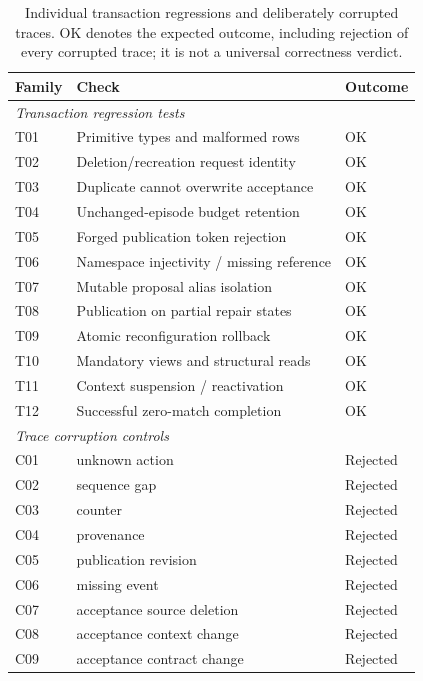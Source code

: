 \documentclass[pdflatex,sn-mathphys-num]{sn-jnl}
\theoremstyle{thmstyleone}
\theoremstyle{thmstylethree}
\theoremstyle{thmstyletwo}
\begin{document}
\begin{table}[tbp]
\centering
\caption{Individual transaction regressions and deliberately corrupted traces. OK denotes the expected outcome, including rejection of every corrupted trace; it is not a universal correctness verdict.}\label{tab:negative-controls}
\footnotesize
\setlength{\tabcolsep}{3pt}
\renewcommand{\arraystretch}{1.13}
\begin{tabularx}{\linewidth}{@{}lXl@{}}\toprule
Family & Check & Outcome\\\midrule
\multicolumn{3}{l}{\textit{Transaction regression tests}}\\
T01 & Primitive types and malformed rows & OK\\
T02 & Deletion/recreation request identity & OK\\
T03 & Duplicate cannot overwrite acceptance & OK\\
T04 & Unchanged-episode budget retention & OK\\
T05 & Forged publication token rejection & OK\\
T06 & Namespace injectivity / missing reference & OK\\
T07 & Mutable proposal alias isolation & OK\\
T08 & Publication on partial repair states & OK\\
T09 & Atomic reconfiguration rollback & OK\\
T10 & Mandatory views and structural reads & OK\\
T11 & Context suspension / reactivation & OK\\
T12 & Successful zero-match completion & OK\\
\midrule\multicolumn{3}{l}{\textit{Trace corruption controls}}\\
C01 & unknown action & Rejected\\
C02 & sequence gap & Rejected\\
C03 & counter & Rejected\\
C04 & provenance & Rejected\\
C05 & publication revision & Rejected\\
C06 & missing event & Rejected\\
C07 & acceptance source deletion & Rejected\\
C08 & acceptance context change & Rejected\\
C09 & acceptance contract change & Rejected\\
\bottomrule\end{tabularx}
\end{table}
\end{document}
